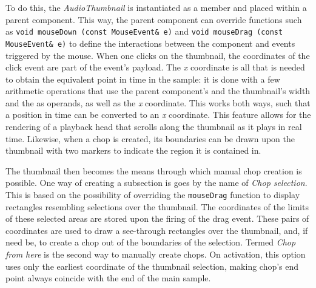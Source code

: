 \documentclass[12pt, a4paper, hidelinks]{article}
\begin{document}
	To do this, the \textit{AudioThumbnail} is instantiated as a member and placed within a parent component. This way, the parent component can override functions such as \texttt{void mouseDown (const MouseEvent\& e)} and \texttt{void mouseDrag (const MouseEvent\& e)} to define the interactions between the component and events triggered by the mouse. When one clicks on the thumbnail, the coordinates of the click event are part of the event's payload. The \textit{x} coordinate is all that is needed to obtain the equivalent point in time in the sample: it is done with a few arithmetic operations that use the parent component's and the thumbnail's width and the as operands, as well as the \textit{x} coordinate. This works both ways, such that a position in time can be converted to an \textit{x} coordinate. This feature allows for the rendering of a playback head that scrolls along the thumbnail as it plays in real time. Likewise, when a chop is created, its boundaries can be drawn upon the thumbnail with two markers to indicate the region it is contained in.\par
	
	The thumbnail then becomes the means through which manual chop creation is possible. One way of creating a subsection is goes by the name of \textit{Chop selection}. This is based on the possibility of overriding the \texttt{mouseDrag} function to display rectangles resembling selections over the thumbnail. The coordinates of the limits of these selected areas are stored upon the firing of the drag event. These pairs of coordinates are used to draw a see-through rectangles over the thumbnail, and, if need be, to create a chop out of the boundaries of the selection. Termed \textit{Chop from here} is the second way to manually create chops. On activation, this option uses only the earliest coordinate of the thumbnail selection, making chop's end point always coincide with the end of the main sample. \par
\end{document}
